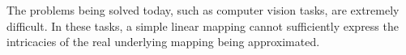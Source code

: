 The problems being solved today, such as computer vision tasks, are extremely difficult.
In these tasks, a simple linear mapping cannot sufficiently express the intricacies of the real underlying mapping being approximated.



